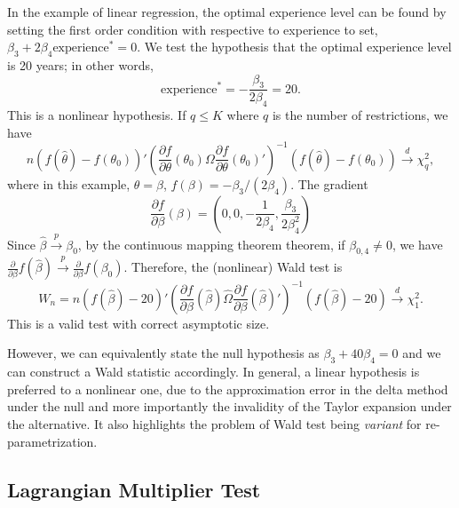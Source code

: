 \documentclass[11pt]{article}
\begin{document}
    In the example of linear regression, the optimal experience level can be
found by setting the first order condition with respective to experience
to set, \(\beta_{3}+2\beta_{4}\mbox{experience}^{*}=0\). We test the
hypothesis that the optimal experience level is 20 years; in other
words, \[\mbox{experience}^{*}=-\frac{\beta_{3}}{2\beta_{4}}=20.\] This
is a nonlinear hypothesis. If \(q\leq K\) where \(q\) is the number of
restrictions, we have
\[n\left(f\left(\widehat{\theta}\right)-f\left(\theta_{0}\right)\right)'\left(\frac{\partial f}{\partial\theta}\left(\theta_{0}\right)\Omega\frac{\partial f}{\partial\theta}\left(\theta_{0}\right)'\right)^{-1}\left(f\left(\widehat{\theta}\right)-f\left(\theta_{0}\right)\right)\stackrel{d}{\to}\chi_{q}^{2},\]
where in this example, \(\theta=\beta\),
\(f\left(\beta\right)=-\beta_{3}/\left(2\beta_{4}\right)\). The gradient
\[\frac{\partial f}{\partial\beta}\left(\beta\right)=\left(0,0,-\frac{1}{2\beta_{4}},\frac{\beta_{3}}{2\beta_{4}^{2}}\right)\]
Since \(\widehat{\beta}\stackrel{p}{\to}\beta_{0}\), by the continuous
mapping theorem theorem, if \(\beta_{0,4}\neq0\), we have
\(\frac{\partial}{\partial\beta}f\left(\widehat{\beta}\right)\stackrel{p}{\to}\frac{\partial}{\partial\beta}f\left(\beta_{0}\right)\).
Therefore, the (nonlinear) Wald test is
\[W_{n}=n\left(f\left(\widehat{\beta}\right)-20\right)'\left(\frac{\partial f}{\partial\beta}\left(\widehat{\beta}\right)\widehat{\Omega}\frac{\partial f}{\partial\beta}\left(\widehat{\beta}\right)'\right)^{-1}\left(f\left(\widehat{\beta}\right)-20\right)\stackrel{d}{\to}\chi_{1}^{2}.\]
This is a valid test with correct asymptotic size.

However, we can equivalently state the null hypothesis as
\(\beta_{3}+40\beta_{4}=0\) and we can construct a Wald statistic
accordingly. In general, a linear hypothesis is preferred to a nonlinear
one, due to the approximation error in the delta method under the null
and more importantly the invalidity of the Taylor expansion under the
alternative. It also highlights the problem of Wald test being
\emph{variant} for re-parametrization.

    \subsection{Lagrangian Multiplier
Test}\label{lagrangian-multiplier-test}
\end{document}
